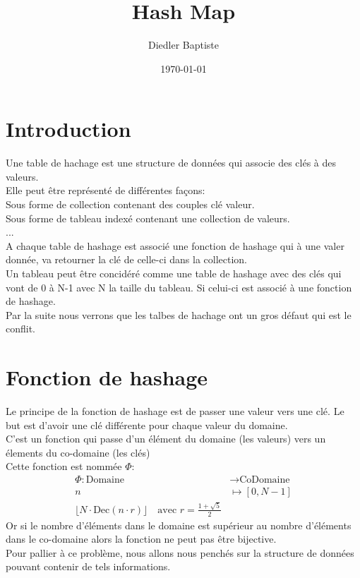 \documentclass[a4paper, 9pt]{article}
\date{\today}
\author{Diedler Baptiste}
\title{Hash Map}
\begin{document}
\maketitle

\section{Introduction}
    Une table de hachage est une structure de données qui associe des clés à des valeurs.\\
    Elle peut être représenté de différentes façons:\\
    Sous forme de collection contenant des couples clé valeur.\\
    Sous forme de tableau indexé contenant une collection de valeurs.\\
    ...\\
    A chaque table de hashage est associé une fonction de hashage qui à une valer donnée, va retourner la clé de celle-ci dans la collection.\\
    Un tableau peut être concidéré comme une table de hashage avec des clés qui vont de 0 à N-1 avec N la taille du tableau. Si celui-ci est associé à une fonction de hashage.\\
    Par la suite nous verrons que les talbes de hachage ont un gros défaut qui est le conflit.\\

\section{Fonction de hashage}
    Le principe de la fonction de hashage est de passer une valeur vers une clé. Le but est d'avoir une clé différente pour chaque valeur du domaine.\\
    C'est un fonction qui passe d'un élément du domaine (les valeurs) vers un élements du co-domaine (les clés)\\
    Cette fonction est nommée $\Phi$:\\
    \begin{align*}
        \Phi : \text{Domaine} &\rightarrow \text{CoDomaine} \\
        n &\mapsto [0, N-1] \\
        \lfloor N \cdot \text{Dec}(n \cdot r) \rfloor \quad \text{avec } r = \frac{1 + \sqrt{5}}{2}
    \end{align*}
    Or si le nombre d'éléments dans le domaine est supérieur au nombre d'éléments dans le co-domaine alors la fonction ne peut pas être bijective.\\
    Pour pallier à ce problème, nous allons nous penchés sur la structure de données pouvant contenir de tels informations.\\
\end{document}
